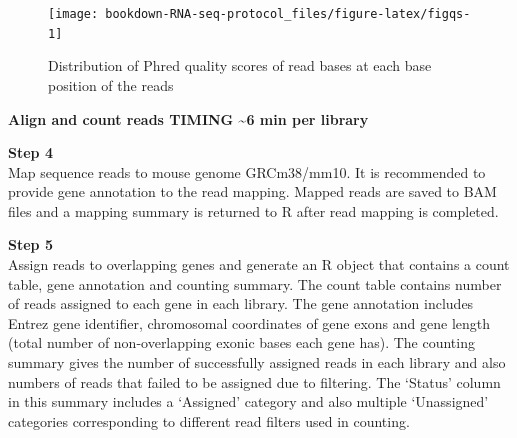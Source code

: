 \documentclass[]{book}
\newenvironment{Shaded}{\begin{snugshade}}{\end{snugshade}}
\newcommand{\DataTypeTok}[1]{\textcolor[rgb]{0.13,0.29,0.53}{#1}}
\newcommand{\DecValTok}[1]{\textcolor[rgb]{0.00,0.00,0.81}{#1}}
\newcommand{\KeywordTok}[1]{\textcolor[rgb]{0.13,0.29,0.53}{\textbf{#1}}}
\newcommand{\NormalTok}[1]{#1}
\newcommand{\OperatorTok}[1]{\textcolor[rgb]{0.81,0.36,0.00}{\textbf{#1}}}
\newcommand{\OtherTok}[1]{\textcolor[rgb]{0.56,0.35,0.01}{#1}}
\newcommand{\StringTok}[1]{\textcolor[rgb]{0.31,0.60,0.02}{#1}}
\begin{document}
\begin{figure}

{\centering \texttt{[image: bookdown-RNA-seq-protocol\_files/figure-latex/figqs-1]} 

}

\caption{Distribution of Phred quality scores of read bases at each base position of the reads}\label{fig:figqs}
\end{figure}

\textbf{Align and count reads TIMING \textasciitilde{}6 min per library}

\textbf{Step 4}\\
Map sequence reads to mouse genome GRCm38/mm10. It is recommended to provide gene annotation to the read mapping. Mapped reads are saved to BAM files and a mapping summary is returned to R after read mapping is completed.

\begin{Shaded}
\end{Shaded}

\textbf{Step 5}\\
Assign reads to overlapping genes and generate an R object that contains a count table, gene annotation and counting summary. The count table contains number of reads assigned to each gene in each library. The gene annotation includes Entrez gene identifier, chromosomal coordinates of gene exons and gene length (total number of non-overlapping exonic bases each gene has). The counting summary gives the number of successfully assigned reads in each library and also numbers of reads that failed to be assigned due to filtering. The `Status' column in this summary includes a `Assigned' category and also multiple `Unassigned' categories corresponding to different read filters used in counting.
\end{document}
